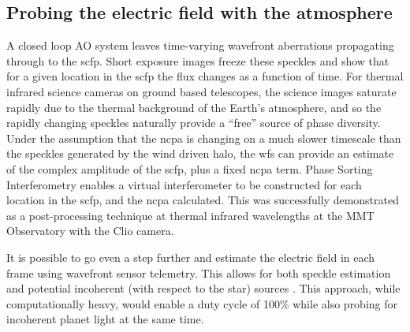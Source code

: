 \documentclass[letterpaper]{ar-1col}
\newcommand{\notebooksuggestion}[1]{\textcolor{blue}{[Notebook: #1]}}
\begin{document}
\subsection{Probing the electric field with the atmosphere}
A closed loop AO system leaves time-varying wavefront aberrations propagating through to the \ac{scfp}.
%
Short exposure images freeze these speckles and show that for a given location in the \ac{scfp} the flux changes as a function of time.
%
For thermal infrared science cameras on ground based telescopes, the science images saturate rapidly due to the thermal background of the Earth's atmosphere, and so the rapidly changing speckles naturally provide a ``free'' source of phase diversity.
%
Under the assumption that the \ac{ncpa} is changing on a much slower timescale than the speckles generated by the wind driven halo, the \ac{wfs} can provide an estimate of the complex amplitude of the \ac{scfp}, plus a fixed \ac{ncpa} term.
%
Phase Sorting Interferometry \citep[PSI; ][]{Codona13} enables a virtual interferometer to be constructed for each location in the \ac{scfp}, and the \ac{ncpa} calculated.
%
This was successfully demonstrated as a post-processing technique at thermal infrared wavelengths at the MMT Observatory with the Clio camera.

It is possible to go even a step further and estimate the electric field in each frame using wavefront sensor telemetry. This allows for both speckle estimation and potential incoherent (with respect to the star) sources \citep{rodack2021millisecond, frazin2021millisecond}. This approach, while computationally heavy, would enable a duty cycle of 100\% while also probing for incoherent planet light at the same time.






\end{document}

